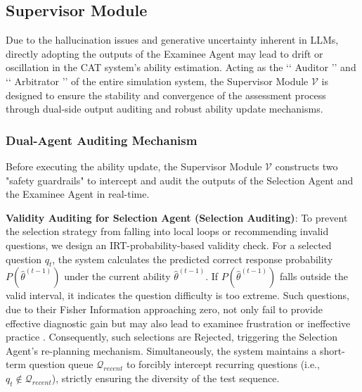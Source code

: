 \subsection{Supervisor Module}
Due to the hallucination issues and generative uncertainty inherent in LLMs\cite{zhang2025llm}, directly adopting the outputs of the Examinee Agent may lead to drift or oscillation in the CAT system's ability estimation\cite{shinn2023reflexion}. Acting as the ‘‘ Auditor ’’ and ‘‘  Arbitrator ’’ of the entire simulation system, the Supervisor Module $\mathcal{V}$ is designed to ensure the stability and convergence of the assessment process through dual-side output auditing and robust ability update mechanisms\cite{ma2025advancing}.


\subsubsection{Dual-Agent Auditing Mechanism}
Before executing the ability update, the Supervisor Module $\mathcal{V}$ constructs two "safety guardrails" to intercept and audit the outputs of the Selection Agent and the Examinee Agent in real-time.

\textbf{Validity Auditing for Selection Agent (Selection Auditing)}:
To prevent the selection strategy from falling into local loops or recommending invalid questions, we design an IRT-probability-based validity check. For a selected question $q_t$, the system calculates the predicted correct response probability $P(\hat{\theta}^{(t-1)})$ under the current ability $\hat{\theta}^{(t-1)}$. If $P(\hat{\theta}^{(t-1)})$ falls outside the valid interval, it indicates the question difficulty is too extreme. Such questions, due to their Fisher Information approaching zero, not only fail to provide effective diagnostic gain but may also lead to examinee frustration or ineffective practice \cite{lord2012applications}. Consequently, such selections are Rejected, triggering the Selection Agent's re-planning mechanism. Simultaneously, the system maintains a short-term question queue $\mathcal{Q}_{recent}$ to forcibly intercept recurring questions (i.e., $q_t \notin \mathcal{Q}_{recent}$), strictly ensuring the diversity of the test sequence.



